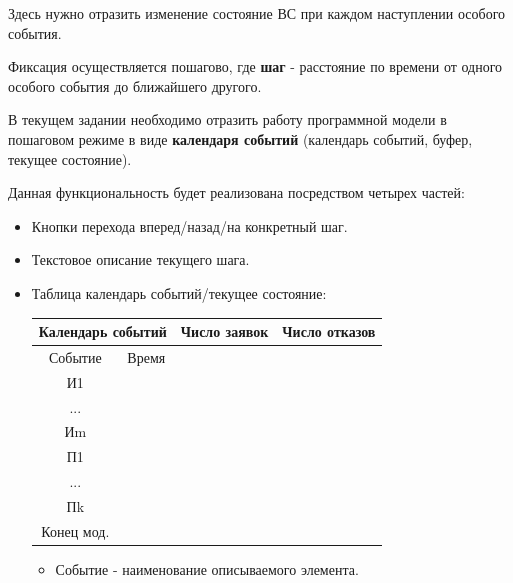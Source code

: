 \documentclass[a4paper, 14pt]{article}
\begin{document}
Здесь нужно отразить изменение состояние ВС при каждом наступлении особого события.

Фиксация осуществляется пошагово, где \textbf{шаг} - расстояние по времени от одного особого события до ближайшего другого.

В текущем задании необходимо отразить работу программной модели в пошаговом режиме в виде \textbf{календаря событий} (календарь событий, буфер, текущее состояние).

Данная функциональность будет реализована посредством четырех частей:

\begin{itemize}
	\item Кнопки перехода вперед/назад/на конкретный шаг.
	\item Текстовое описание текущего шага.
	\item Таблица календарь событий/текущее состояние:
	      \begin{center}
		      \begin{tabular}{|c|c|c|c|}
			      \hline
			      \multicolumn{2}{|c|}{Календарь событий} & Число заявок & Число отказов   \\
			      \hline
			      Событие                                 & Время        &               & \\
			      \hline
			      И1                                      &              &               & \\
			      \hline
			      ...                                     &              &               & \\
			      \hline
			      Иm                                      &              &               & \\
			      \hline
			      П1                                      &              &               & \\
			      \hline
			      ...                                     &              &               & \\
			      \hline
			      Пk                                      &              &               & \\
			      \hline
			      Конец мод.                              &              &               & \\
			      \hline
		      \end{tabular}
	      \end{center}
	      \begin{itemize}
		      \item Событие - наименование описываемого элемента.

\end{itemize}
\end{itemize}
\end{document}
